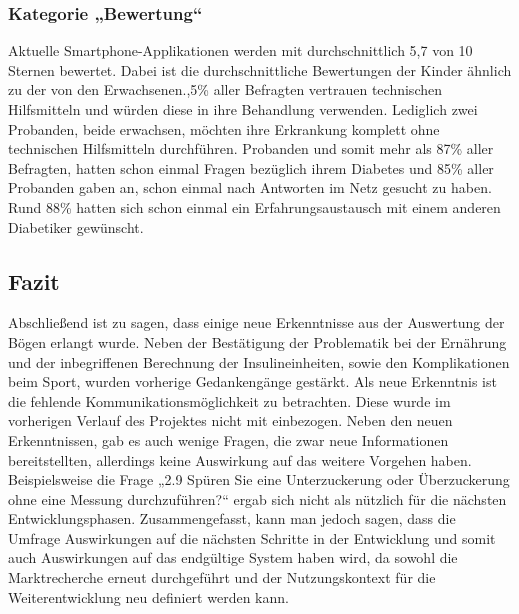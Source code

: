 \documentclass[a4paper,11pt]{article}%
\renewcommand{\\}{\vspace*{0.5\baselineskip} \newline}
\begin{document}
	\subsubsection{Kategorie „Bewertung“}
	Aktuelle Smartphone-Applikationen werden mit durchschnittlich 5,7 von 10 Sternen bewertet. Dabei ist die durchschnittliche Bewertungen der Kinder ähnlich zu der von den Erwachsenen.,5\% aller Befragten vertrauen technischen Hilfsmitteln und würden diese in ihre Behandlung verwenden. Lediglich zwei Probanden, beide erwachsen, möchten ihre Erkrankung komplett ohne technischen Hilfsmitteln durchführen. Probanden und somit mehr als 87\% aller Befragten, hatten schon einmal Fragen bezüglich ihrem Diabetes und 85\% aller Probanden gaben an, schon einmal nach Antworten im Netz gesucht zu haben. Rund 88\% hatten sich schon einmal ein Erfahrungsaustausch mit einem anderen Diabetiker gewünscht.
	\subsection{Fazit}
	Abschließend ist zu sagen, dass einige neue Erkenntnisse aus der Auswertung der Bögen erlangt wurde. Neben der Bestätigung der Problematik bei der Ernährung und der inbegriffenen Berechnung der Insulineinheiten, sowie den Komplikationen beim Sport, wurden vorherige Gedankengänge gestärkt. Als neue Erkenntnis ist die fehlende Kommunikationsmöglichkeit zu betrachten. Diese wurde im vorherigen Verlauf des Projektes nicht mit einbezogen. Neben den neuen Erkenntnissen, gab es auch wenige Fragen, die zwar neue Informationen bereitstellten, allerdings keine Auswirkung auf das weitere Vorgehen haben. Beispielsweise die Frage „2.9 Spüren Sie eine Unterzuckerung oder Überzuckerung ohne eine Messung durchzuführen?“ ergab sich nicht als nützlich für die nächsten Entwicklungsphasen. Zusammengefasst, kann man jedoch sagen, dass die Umfrage Auswirkungen auf die nächsten Schritte in der Entwicklung und somit auch Auswirkungen auf das endgültige System haben wird, da sowohl die Marktrecherche erneut durchgeführt und der Nutzungskontext für die Weiterentwicklung neu definiert werden kann.
	\newpage
	\appendix
\end{document}
